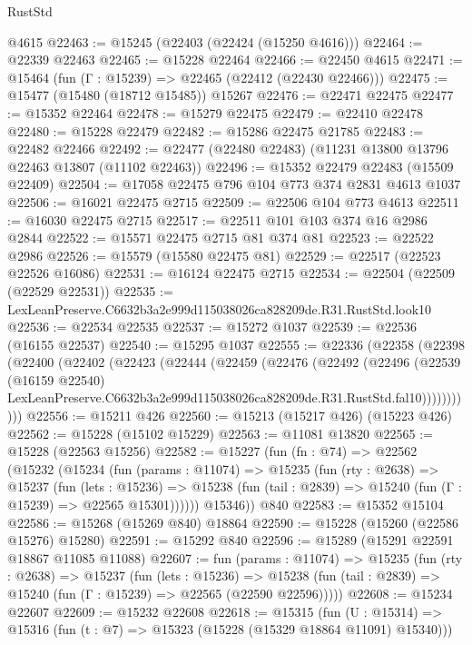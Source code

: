 \begin{lexlean}{RustStd}
\begin{coremodule}
    @4615
@22463 := @15245 (@22403 (@22424 (@15250 @4616)))
@22464 := @22339 @22463
@22465 := @15228 @22464
@22466 := @22450 @4615
@22471 := @15464 (fun (Γ : @15239) => @22465 (@22412 (@22430 @22466)))
@22475 := @15477 (@15480 (@18712 @15485)) @15267
@22476 := @22471 @22475
@22477 := @15352 @22464
@22478 := @15279 @22475
@22479 := @22410 @22478
@22480 := @15228 @22479
@22482 := @15286 @22475 @21785
@22483 := @22482 @22466
@22492 := @22477 (@22480 @22483) (@11231 @13800 @13796 @22463 @13807 (@11102 @22463))
@22496 := @15352 @22479 @22483 (@15509 @22409)
@22504 := @17058 @22475 @796 @104 @773 @374 @2831 @4613 @1037
@22506 := @16021 @22475 @2715
@22509 := @22506 @104 @773 @4613
@22511 := @16030 @22475 @2715
@22517 := @22511 @101 @103 @374 @16 @2986 @2844
@22522 := @15571 @22475 @2715 @81 @374 @81
@22523 := @22522 @2986
@22526 := @15579 (@15580 @22475 @81)
@22529 := @22517 (@22523 @22526 @16086)
@22531 := @16124 @22475 @2715
@22534 := @22504 (@22509 (@22529 @22531))
@22535 := LexLeanPreserve.C6632b3a2e999d115038026ca828209de.R31.RustStd.look10
@22536 := @22534 @22535
@22537 := @15272 @1037
@22539 := @22536 (@16155 @22537)
@22540 := @15295 @1037
@22555 := @22336
    (@22358
      (@22398
        (@22400
          (@22402
            (@22423
              (@22444
                (@22459
                  (@22476
                    (@22492
                      (@22496
                        (@22539
                          (@16159 @22540)
                          LexLeanPreserve.C6632b3a2e999d115038026ca828209de.R31.RustStd.fal10)))))))))))
@22556 := @15211 @426
@22560 := @15213 (@15217 @426) (@15223 @426)
@22562 := @15228 (@15102 @15229)
@22563 := @11081 @13820
@22565 := @15228 (@22563 @15256)
@22582 := @15227
    (fun (fn : @74) =>
    @22562
      (@15232
        (@15234
          (fun (params : @11074) =>
          @15235
            (fun (rty : @2638) =>
            @15237
              (fun (lets : @15236) =>
              @15238 (fun (tail : @2839) => @15240 (fun (Γ : @15239) => @22565 @15301))))))
        @15346))
    @840
@22583 := @15352 @15104
@22586 := @15268 (@15269 @840) @18864
@22590 := @15228 (@15260 (@22586 @15276) @15280)
@22591 := @15292 @840
@22596 := @15289 (@15291 @22591 @18867 @11085 @11088)
@22607 := fun (params : @11074) =>
  @15235
    (fun (rty : @2638) =>
    @15237
      (fun (lets : @15236) =>
      @15238 (fun (tail : @2839) => @15240 (fun (Γ : @15239) => @22565 (@22590 @22596)))))
@22608 := @15234 @22607
@22609 := @15232 @22608
@22618 := @15315
    (fun (U : @15314) => @15316 (fun (t : @7) => @15323 (@15228 (@15329 @18864 @11091) @15340)))

\end{coremodule}
\end{lexlean}
